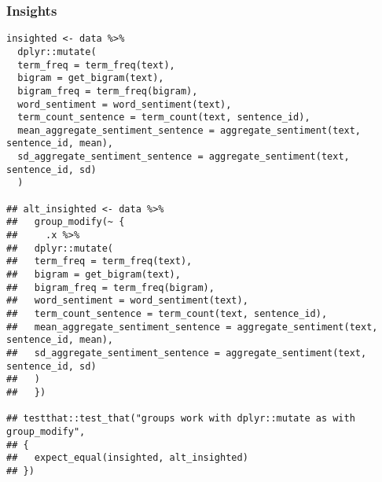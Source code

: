 \documentclass[a4paper, 11pt]{article}
\begin{document}
\subsubsection{Insights}
\label{sec:orgebb504f}
\begin{verbatim}
insighted <- data %>%
  dplyr::mutate(
  term_freq = term_freq(text),
  bigram = get_bigram(text),
  bigram_freq = term_freq(bigram),
  word_sentiment = word_sentiment(text),
  term_count_sentence = term_count(text, sentence_id),
  mean_aggregate_sentiment_sentence = aggregate_sentiment(text, sentence_id, mean),
  sd_aggregate_sentiment_sentence = aggregate_sentiment(text, sentence_id, sd)
  )

## alt_insighted <- data %>%
##   group_modify(~ {
##     .x %>%
##   dplyr::mutate(
##   term_freq = term_freq(text),
##   bigram = get_bigram(text),
##   bigram_freq = term_freq(bigram),
##   word_sentiment = word_sentiment(text),
##   term_count_sentence = term_count(text, sentence_id),
##   mean_aggregate_sentiment_sentence = aggregate_sentiment(text, sentence_id, mean),
##   sd_aggregate_sentiment_sentence = aggregate_sentiment(text, sentence_id, sd)
##   )      
##   })

## testthat::test_that("groups work with dplyr::mutate as with group_modify",
## {
##   expect_equal(insighted, alt_insighted)
## })
\end{verbatim}
\end{document}
